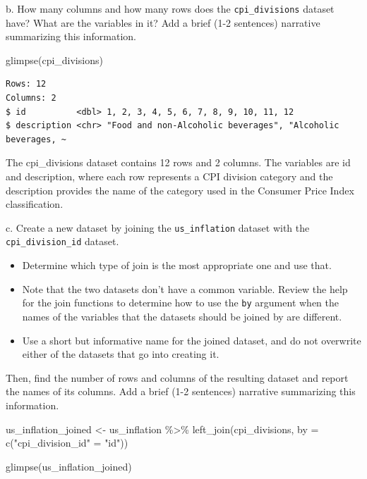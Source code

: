 \documentclass[
  letterpaper,
  DIV=11,
  numbers=noendperiod]{scrartcl}
\newenvironment{Shaded}{\begin{snugshade}}{\end{snugshade}}
\newcommand{\AttributeTok}[1]{\textcolor[rgb]{0.40,0.45,0.13}{#1}}
\newcommand{\FunctionTok}[1]{\textcolor[rgb]{0.28,0.35,0.67}{#1}}
\newcommand{\NormalTok}[1]{\textcolor[rgb]{0.00,0.23,0.31}{#1}}
\newcommand{\OtherTok}[1]{\textcolor[rgb]{0.00,0.23,0.31}{#1}}
\newcommand{\SpecialCharTok}[1]{\textcolor[rgb]{0.37,0.37,0.37}{#1}}
\newcommand{\StringTok}[1]{\textcolor[rgb]{0.13,0.47,0.30}{#1}}
\begin{document}
b. How many columns and how many rows does the \texttt{cpi\_divisions}
dataset have? What are the variables in it? Add a brief (1-2 sentences)
narrative summarizing this information.

\begin{Shaded}
\begin{Highlighting}[]
\FunctionTok{glimpse}\NormalTok{(cpi\_divisions)}
\end{Highlighting}
\end{Shaded}

\begin{verbatim}
Rows: 12
Columns: 2
$ id          <dbl> 1, 2, 3, 4, 5, 6, 7, 8, 9, 10, 11, 12
$ description <chr> "Food and non-Alcoholic beverages", "Alcoholic beverages, ~
\end{verbatim}

The cpi\_divisions dataset contains 12 rows and 2 columns. The variables
are id and description, where each row represents a CPI division
category and the description provides the name of the category used in
the Consumer Price Index classification.

c. Create a new dataset by joining the \texttt{us\_inflation} dataset
with the \texttt{cpi\_division\_id} dataset.

\begin{itemize}
\item
  Determine which type of join is the most appropriate one and use that.
\item
  Note that the two datasets don't have a common variable. Review the
  help for the join functions to determine how to use the \texttt{by}
  argument when the names of the variables that the datasets should be
  joined by are different.
\item
  Use a short but informative name for the joined dataset, and do not
  overwrite either of the datasets that go into creating it.
\end{itemize}

Then, find the number of rows and columns of the resulting dataset and
report the names of its columns. Add a brief (1-2 sentences) narrative
summarizing this information.

\begin{Shaded}
\begin{Highlighting}[]
\NormalTok{us\_inflation\_joined }\OtherTok{\textless{}{-}}\NormalTok{ us\_inflation }\SpecialCharTok{\%\textgreater{}\%}
  \FunctionTok{left\_join}\NormalTok{(cpi\_divisions, }\AttributeTok{by =} \FunctionTok{c}\NormalTok{(}\StringTok{"cpi\_division\_id"} \OtherTok{=} \StringTok{"id"}\NormalTok{))}

\FunctionTok{glimpse}\NormalTok{(us\_inflation\_joined)}
\end{Highlighting}
\end{Shaded}
\end{document}
